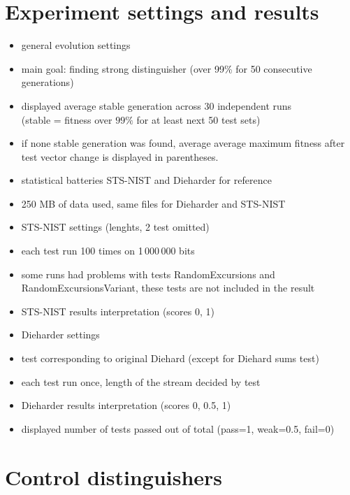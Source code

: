 \documentclass[12pt,oneside]{fithesis2}
\begin{document}
\chapter{Experiment settings and results}
\label{chap:settings-results}

\begin{itemize}
\item general evolution settings
\item main goal: finding strong distinguisher (over 99\% for 50 consecutive generations)
\item displayed average stable generation across 30 independent runs \\
(stable = fitness over $99\%$ for at least next 50 test sets)
\item if none stable generation was found, average average maximum fitness after test vector change is displayed in parentheses.
\item statistical batteries STS-NIST and Dieharder for reference
\item 250 MB of data used, same files for Dieharder and STS-NIST
\item STS-NIST settings (lenghts, 2 test omitted)
\item each test run 100 times on 1\,000\,000 bits
\item some runs had problems with tests RandomExcursions and RandomExcursionsVariant, these tests are not included in the result
\item STS-NIST results interpretation (scores 0, 1)
\item Dieharder settings
\item test corresponding to original Diehard (except for Diehard sums test)
\item each test run once, length of the stream decided by test
\item Dieharder results interpretation (scores 0, 0.5, 1)
\item displayed number of tests passed out of total (pass=1, weak=0.5, fail=0)
\end{itemize}

\chapter{Control distinguishers}
\label{chap:distinguish-control}
\end{document}
